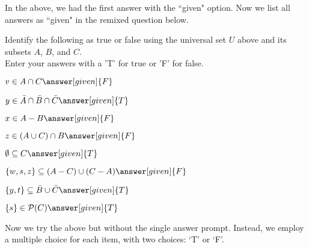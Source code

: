 \documentclass{ximera}
\begin{document}
In the above, we had the first answer with the ``given" option. Now we list all answers as ``given" in the remixed question below.
\begin{question}
Identify the following as true or false using the universal set $U$ above and its subsets $A$, $B$, and $C$. \\ Enter your answers with a 'T' for true or 'F' for false.
\begin{prompt}
    \begin{enumerate}
    \begin{multicols}{2}

        \item $v \in A \cap C  \answer[given]{F}$
			
			\item $y \in \bar{A} \cap \bar{B} \cap \bar{C}  \answer[given]{T}$
			
			\item $x \in A - B \answer[given]{F} $
			
			\item $z \in (A \cup C) \cap B  \answer[given]{F}$
			
			\item $\emptyset \subseteq C \answer[given]{T}$
			
			\item $\{w, s, z\} \subseteq (A - C) \cup (C - A) \answer[given]{F}$
			
			\item $\{y,t\} \subseteq \bar{B} \cup \bar{C} \answer[given]{T}$
			
			\item $\{s\} \in \mathcal{P}(C) \answer[given]{T}$
    \end{multicols}
    \end{enumerate}
\end{prompt}
\end{question}

Now we try the above but without the single answer prompt. Instead, we employ a multiple choice for each item, with two choices: `T' or `F'.
\end{document}
